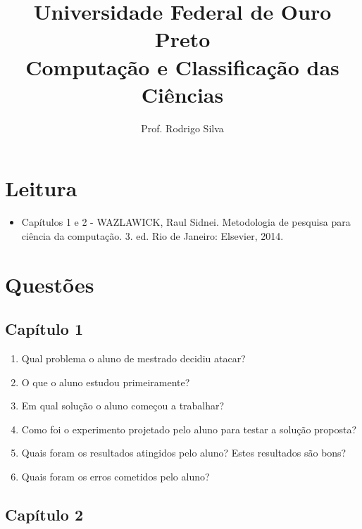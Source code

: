 \documentclass{article}
\title{\vspace{-2 cm}Universidade Federal de Ouro Preto \\ Computação e Classificação das Ciências}
\author{Prof. Rodrigo Silva}
\date{}
\begin{document}
\maketitle

\section{Leitura}

\begin{itemize}
    \item Capítulos 1 e 2 - WAZLAWICK, Raul Sidnei. Metodologia de pesquisa para ciência da computação. 3. ed. Rio de Janeiro: Elsevier, 2014.
\end{itemize}

\section{Questões}

\subsection{Capítulo 1}

\begin{enumerate}

\item Qual problema o aluno de mestrado decidiu atacar?

\item O que o aluno estudou primeiramente?

\item Em qual solução o aluno começou a trabalhar?  

\item Como foi o experimento projetado pelo aluno para testar a solução proposta?

\item Quais foram os resultados atingidos pelo aluno? Estes resultados são bons? 

\item Quais foram os erros cometidos pelo aluno?

\end{enumerate}

\subsection{Capítulo 2}
\end{document}
